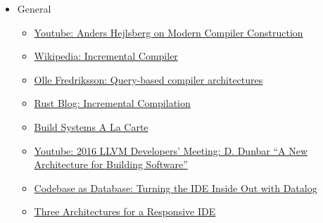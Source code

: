 \documentclass[12pt, a4paper]{report}
\begin{document}
\begin{itemize}[noitemsep]

\item General
  \begin{itemize}[noitemsep]
  \item \href{https://www.youtube.com/watch?v=wSdV1M7n4gQ}{\CheckedBox Youtube: Anders Hejlsberg on Modern Compiler Construction} \cite{hejlsberg_modern_compiler_construction}
  \item \href{https://en.wikipedia.org/wiki/Incremental_compiler}{\CheckedBox Wikipedia: Incremental Compiler} \cite{wiki_incremental_compiler}
  \item \href{https://ollef.github.io/blog/posts/query-based-compilers.html}{\CheckedBox Olle Fredriksson: Query-based compiler architectures} \cite{olle_query_based}
  \item \href{https://blog.rust-lang.org/2016/09/08/incremental.html}{\CheckedBox Rust Blog: Incremental Compilation} \cite{rust_blog_incremental_compilation}
  \item \href{https://www.microsoft.com/en-us/research/publication/build-systems-la-carte/}{\Square Build Systems A La Carte} \cite{mokhov2018build}
  \item \href{https://www.youtube.com/watch?v=b_T-eCToX1I}{\CheckedBox Youtube: 2016 LLVM Developers’ Meeting: D. Dunbar “A New Architecture for Building Software”} \cite{dunbar2016}
  \item \href{https://petevilter.me/post/datalog-typechecking/}{\Square Codebase as Database: Turning the IDE Inside Out with Datalog}
  \item \href{https://rust-analyzer.github.io/blog/2020/07/20/three-architectures-for-responsive-ide.html}{\Square Three Architectures for a Responsive IDE}






\end{itemize}
\end{itemize}
\end{document}
